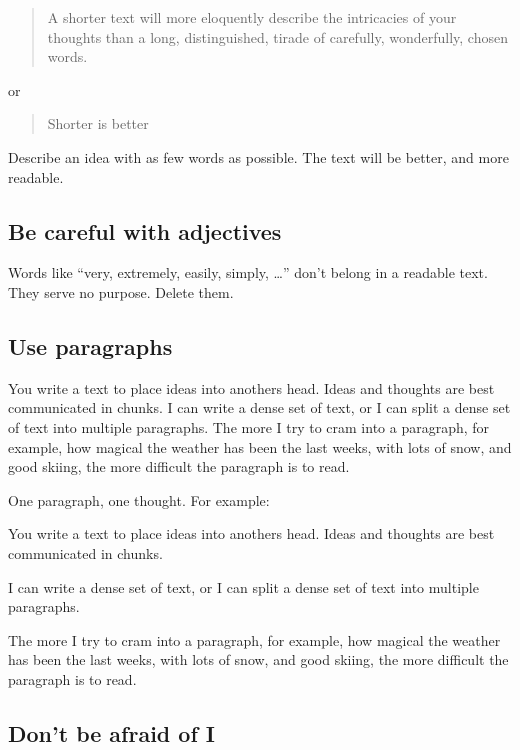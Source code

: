 \begin{quote}
A shorter text will more eloquently describe the intricacies of your
thoughts than a long, distinguished, tirade of carefully, wonderfully,
chosen words.
\end{quote}

or

\begin{quote}
Shorter is better
\end{quote}

Describe an idea with as few words as possible. The text will be better,
and more readable.

\subsection{Be careful with
adjectives}\label{be-careful-with-adjectives}

Words like ``very, extremely, easily, simply, \ldots{}'' don't belong in
a readable text. They serve no purpose. Delete them.

\subsection{Use paragraphs}\label{use-paragraphs}

You write a text to place ideas into anothers head. Ideas and thoughts
are best communicated in chunks. I can write a dense set of text, or I
can split a dense set of text into multiple paragraphs. The more I try
to cram into a paragraph, for example, how magical the weather has been
the last weeks, with lots of snow, and good skiing, the more difficult
the paragraph is to read.

One paragraph, one thought. For example:

You write a text to place ideas into anothers head. Ideas and thoughts
are best communicated in chunks.

I can write a dense set of text, or I can split a dense set of text into
multiple paragraphs.

The more I try to cram into a paragraph, for example, how magical the
weather has been the last weeks, with lots of snow, and good skiing, the
more difficult the paragraph is to read.

\subsection{Don't be afraid of I}\label{dont-be-afraid-of-i}

